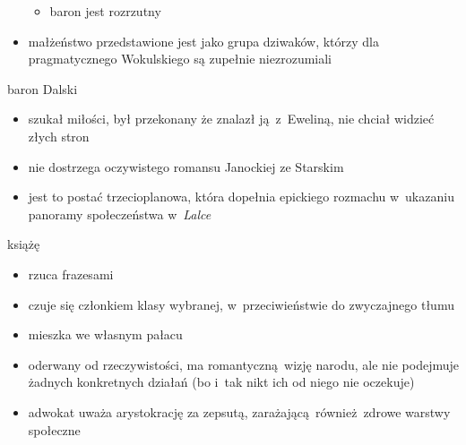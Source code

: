 \begin{description}
\begin{itemize}
\begin{itemize}
                    \item baron jest rozrzutny
                \end{itemize}
            \item małżeństwo przedstawione jest jako grupa dziwaków, którzy dla pragmatycznego Wokulskiego są zupełnie niezrozumiali
        \end{itemize}
    \item baron Dalski
        \begin{itemize}
            \item szukał miłości, był przekonany że znalazł ją z~Eweliną, nie chciał widzieć złych stron
            \item nie dostrzega oczywistego romansu Janockiej ze Starskim
            \item jest to postać trzecioplanowa, która dopełnia epickiego rozmachu w~ukazaniu panoramy społeczeństwa w~\textit{Lalce}
        \end{itemize}
    \item książę
        \begin{itemize}
            \item rzuca frazesami
            \item czuje się członkiem klasy wybranej, w~przeciwieństwie do zwyczajnego tłumu
            \item mieszka we własnym pałacu
            \item oderwany od rzeczywistości, ma romantyczną wizję narodu, ale nie podejmuje żadnych konkretnych działań (bo i~tak nikt ich od niego nie oczekuje)
            \item adwokat uważa arystokrację za zepsutą, zarażającą również zdrowe warstwy społeczne
        \end{itemize}
\end{description}